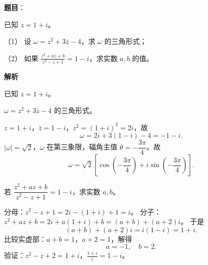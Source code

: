 \begin{answer}

\textbf{题目}：

已知 $z=1+i$。

（1） 设 $\omega=z^2+3\bar z-4$，求 $\omega$ 的三角形式；

（2） 如果 $\frac{z^2+az+b}{z^2-z+1}=1-i$，求实数 $a,b$ 的值。

\textbf{解析}

已知 $z=1+i$。


$\omega=z^2+3\bar z-4$ 的三角形式。

$z=1+i$，$\bar z=1-i$，$z^2=(1+i)^2=2i$，故
\nopagebreak[4]
\[
\omega=2i+3(1-i)-4=-1-i.
\]
$|\omega|=\sqrt2$，$\omega$ 在第三象限，辐角主值 $\theta=-\dfrac{3\pi}{4}$。故
\nopagebreak[4]
\[
\omega=\sqrt2\left[\cos\left(-\frac{3\pi}{4}\right)+i\sin\left(-\frac{3\pi}{4}\right)\right].
\]


若 $\dfrac{z^2+az+b}{z^2-z+1}=1-i$，求实数 $a,b$。

分母：$z^2-z+1=2i-(1+i)+1=i$。
分子：$z^2+az+b=2i+a(1+i)+b=(a+b)+(a+2)i$。
于是
\nopagebreak[4]
\[(a+b)+(a+2)i=i(1-i)=1+i.\]
比较实虚部：$a+b=1$，$a+2=1$，解得
\nopagebreak[4]
\[\boxed{a=-1,\quad b=2.}\]
验证：$z^2-z+2=1+i$，$\frac{1+i}{i}=1-i$。



\end{answer}
